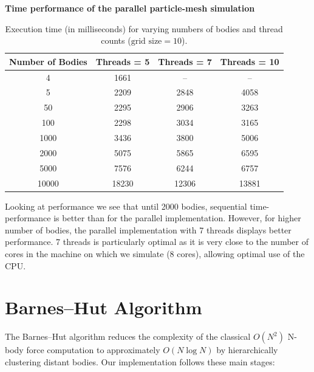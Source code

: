 \documentclass{article}
\begin{document}
\textbf{Time performance of the parallel particle-mesh simulation}
\begin{table}[htbp]
\centering
\begin{tabular}{|c|c|c|c|}
\hline
\textbf{Number of Bodies} & \textbf{Threads = 5} & \textbf{Threads = 7} & \textbf{Threads = 10} \\
\hline
4     & 1661  & --    & --     \\
5     & 2209  & 2848  & 4058   \\
50    & 2295  & 2906  & 3263   \\
100   & 2298  & 3034  & 3165   \\
1000  & 3436  & 3800  & 5006   \\
2000  & 5075  & 5865  & 6595   \\
5000  & 7576  & 6244  & 6757   \\
10000 & 18230 & 12306 & 13881  \\
\hline
\end{tabular}
\caption{Execution time (in milliseconds) for varying numbers of bodies and thread counts ($\text{grid size} = 10$).}
\label{tab:thread_performance}
\end{table}

Looking at performance we see that until 2000 bodies, sequential time-performance is better than for the parallel implementation. However, for higher number of bodies, the parallel implementation with 7 threads displays better performance. 7 threads is particularly optimal as it is very close to the number of cores in the machine on which we simulate (8 cores), allowing optimal use of the CPU.  



\section{Barnes–Hut Algorithm}

The Barnes–Hut algorithm reduces the complexity of the classical \(O(N^2)\) N-body force computation to approximately \(O(N\log N)\) by hierarchically clustering distant bodies.  Our implementation follows these main stages:
\end{document}

